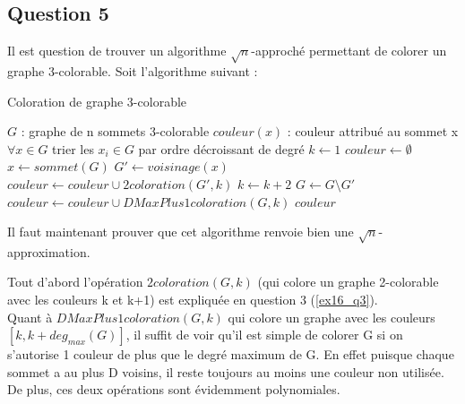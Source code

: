 \subsection{Question 5}\label{ex16_q5}
Il est question de trouver un algorithme $\sqrt{n}$-approch\'e permettant de colorer un
graphe 3-colorable.
Soit l'algorithme suivant :

\begin{center}
\begin{algorithm}[H]
\caption{Coloration de graphe 3-colorable}\label{ex16_algo1}
\begin{algorithmic}[1]
\REQUIRE $G$ : graphe de n sommets 3-colorable
\ENSURE $couleur(x)$ : couleur attribu\'e au sommet x $\forall x \in G$ 
	\STATE trier les $x_i \in G$ par ordre d\'ecroissant de degr\'e
	\STATE $k \leftarrow 1$
	\STATE $couleur \leftarrow \emptyset$
	\REPEAT
		\STATE $x \leftarrow sommet(G)$
		\STATE $G' \leftarrow voisinage(x)$
		\STATE $couleur \leftarrow couleur \cup 2coloration(G',k)$
		\STATE $k \leftarrow k+2$
		\STATE $G \leftarrow G \setminus G'$
	\STATE $couleur \leftarrow couleur \cup DMaxPlus1coloration(G,k)$
\RETURN $couleur$
\end{algorithmic}
\end{algorithm}
\end{center}

Il faut maintenant prouver que cet algorithme renvoie bien une $\sqrt{n}$-approximation.

Tout d'abord l'op\'eration $2coloration(G,k)$ (qui colore un graphe 2-colorable avec
les couleurs k et k+1) est expliqu\'ee en question 3 (\ref{ex16_q3}).\\
Quant \`a $DMaxPlus1coloration(G,k)$ qui colore un graphe avec les couleurs
$[k,k+deg_{max}(G)]$, il suffit de voir qu'il est simple de colorer G si on s'autorise 1
couleur de plus que le degr\'e maximum de G.
En effet puisque chaque sommet a au plus D voisins, il reste toujours au moins une
couleur non utilis\'ee.\\
De plus, ces deux op\'erations sont \'evidemment polynomiales.

